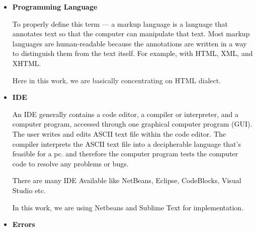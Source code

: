 \documentclass[12pt]{report}
\renewcommand{\_}{\kern-1.5pt\textunderscore\kern-1.5pt}
\begin{document}
\vspace{\baselineskip}
\begin{itemize}
	\item {\fontsize{14pt}{16.8pt}\selectfont \textbf{\textcolor[HTML]{0D0D0D}{Programming Language}}\par}\par


\vspace{\baselineskip}
\textcolor[HTML]{0D0D0D}{To properly define this term — a markup language is a language that annotates text so that the computer can manipulate that text. Most markup languages are human-readable because the annotations are written in a way to distinguish them from the text itself. For example, with HTML, XML, and XHTML.}{\fontsize{11pt}{13.2pt}\selectfont \textcolor[HTML]{0D0D0D}{ \par}Here in this work, we are basically concentrating on HTML dialect.}\par


\vspace{\baselineskip}
	\item {\fontsize{14pt}{16.8pt}\selectfont \textbf{\textcolor[HTML]{0D0D0D}{IDE}}\par}\par


\vspace{\baselineskip}
\textcolor[HTML]{0D0D0D}{An IDE generally contains a code editor, a compiler or interpreter, and a computer program, accessed through one graphical computer program (GUI). The user writes and edits ASCII text file within the code editor. The compiler interprets the ASCII text file into a decipherable language that’s feasible for a pc. and therefore the computer program tests the computer code to resolve any problems or bugs.}\par

\textcolor[HTML]{0D0D0D}{There are many IDE Available like NetBeans, Eclipse, CodeBlocks, Visual Studio etc.}\par

\textcolor[HTML]{0D0D0D}{In this work, we are using Netbeans and Sublime Text for implementation.}\par


\vspace{\baselineskip}
	\item {\fontsize{14pt}{16.8pt}\selectfont \textbf{\textcolor[HTML]{0D0D0D}{Errors}}\par}\par



\end{itemize}
\end{document}
